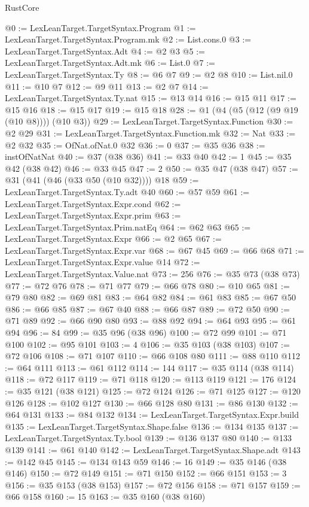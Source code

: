 \begin{lexlean}{RustCore}
\begin{coremodule}
@0 := LexLeanTarget.TargetSyntax.Program
@1 := LexLeanTarget.TargetSyntax.Program.mk
@2 := List.cons.{0}
@3 := LexLeanTarget.TargetSyntax.Adt
@4 := @2 @3
@5 := LexLeanTarget.TargetSyntax.Adt.mk
@6 := List.{0}
@7 := LexLeanTarget.TargetSyntax.Ty
@8 := @6 @7
@9 := @2 @8
@10 := List.nil.{0}
@11 := @10 @7
@12 := @9 @11
@13 := @2 @7
@14 := LexLeanTarget.TargetSyntax.Ty.nat
@15 := @13 @14
@16 := @15 @11
@17 := @15 @16
@18 := @15 @17
@19 := @15 @18
@28 := @1 (@4 (@5 (@12 (@9 @19 (@10 @8)))) (@10 @3))
@29 := LexLeanTarget.TargetSyntax.Function
@30 := @2 @29
@31 := LexLeanTarget.TargetSyntax.Function.mk
@32 := Nat
@33 := @2 @32
@35 := OfNat.ofNat.{0} @32
@36 := 0
@37 := @35 @36
@38 := instOfNatNat
@40 := @37 (@38 @36)
@41 := @33 @40
@42 := 1
@45 := @35 @42 (@38 @42)
@46 := @33 @45
@47 := 2
@50 := @35 @47 (@38 @47)
@57 := @31 (@41 (@46 (@33 @50 (@10 @32)))) @18
@59 := LexLeanTarget.TargetSyntax.Ty.adt @40
@60 := @57 @59
@61 := LexLeanTarget.TargetSyntax.Expr.cond
@62 := LexLeanTarget.TargetSyntax.Expr.prim
@63 := LexLeanTarget.TargetSyntax.Prim.natEq
@64 := @62 @63
@65 := LexLeanTarget.TargetSyntax.Expr
@66 := @2 @65
@67 := LexLeanTarget.TargetSyntax.Expr.var
@68 := @67 @45
@69 := @66 @68
@71 := LexLeanTarget.TargetSyntax.Expr.value @14
@72 := LexLeanTarget.TargetSyntax.Value.nat
@73 := 256
@76 := @35 @73 (@38 @73)
@77 := @72 @76
@78 := @71 @77
@79 := @66 @78
@80 := @10 @65
@81 := @79 @80
@82 := @69 @81
@83 := @64 @82
@84 := @61 @83
@85 := @67 @50
@86 := @66 @85
@87 := @67 @40
@88 := @66 @87
@89 := @72 @50
@90 := @71 @89
@92 := @66 @90 @80
@93 := @88 @92
@94 := @64 @93
@95 := @61 @94
@96 := 84
@99 := @35 @96 (@38 @96)
@100 := @72 @99
@101 := @71 @100
@102 := @95 @101
@103 := 4
@106 := @35 @103 (@38 @103)
@107 := @72 @106
@108 := @71 @107
@110 := @66 @108 @80
@111 := @88 @110
@112 := @64 @111
@113 := @61 @112
@114 := 144
@117 := @35 @114 (@38 @114)
@118 := @72 @117
@119 := @71 @118
@120 := @113 @119
@121 := 176
@124 := @35 @121 (@38 @121)
@125 := @72 @124
@126 := @71 @125
@127 := @120 @126
@128 := @102 @127
@130 := @66 @128 @80
@131 := @86 @130
@132 := @64 @131
@133 := @84 @132
@134 := LexLeanTarget.TargetSyntax.Expr.build
@135 := LexLeanTarget.TargetSyntax.Shape.false
@136 := @134 @135
@137 := LexLeanTarget.TargetSyntax.Ty.bool
@139 := @136 @137 @80
@140 := @133 @139
@141 := @61 @140
@142 := LexLeanTarget.TargetSyntax.Shape.adt
@143 := @142 @45
@145 := @134 @143 @59
@146 := 16
@149 := @35 @146 (@38 @146)
@150 := @72 @149
@151 := @71 @150
@152 := @66 @151
@153 := 3
@156 := @35 @153 (@38 @153)
@157 := @72 @156
@158 := @71 @157
@159 := @66 @158
@160 := 15
@163 := @35 @160 (@38 @160)

\end{coremodule}
\end{lexlean}
